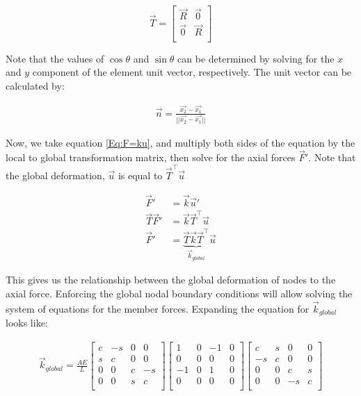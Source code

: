 \begin{equation}
	\vec{T}
	=	
	\begin{bmatrix}
		\vec{R} & \vec{0}\\
		\vec{0} & \vec{R}\\
	\end{bmatrix}
\end{equation}

Note that the values of $\cos\theta$ and $\sin\theta$ can be determined by solving for the $x$ and $y$ component of the element unit vector, respectively. The unit vector can be calculated by:

\begin{align}
	\vec{n} = \frac{\vec{x_2}-\vec{x_1}}{||\vec{x_2}-\vec{x_1}||}
\end{align}

Now, we take equation \ref{Eq:F=ku}, and multiply both sides of the equation by the local to global transformation matrix, then solve for the axial forces $\vec{F}'$. Note that the global deformation, $\vec{u}$ is equal to $\vec{T}^\intercal \vec{u}$

\begin{align}
	\vec{F}' &= \vec{k} \vec{u}'\\
	\vec{T} \vec{F}' &= \vec{k} \vec{T}^\intercal \vec{u}\\
	\vec{F}' &= \underbrace{\vec{T} \vec{k} \vec{T}^\intercal}_{\vec{k}_{global}} \vec{u}
\end{align}

This gives us the relationship between the global deformation of nodes to the axial force. Enforcing the global nodal boundary conditions will allow solving the system of equations for the member forces. Expanding the equation for $\vec{k}_{global}$ looks like:

\begin{align*}
\vec{k}_{global}
=
\frac{AE}{L}
	\begin{bmatrix}
  		c & -s & 0 & 0\\
  		s & c & 0 & 0\\
  		0 & 0 & c & -s\\
  		0 & 0 & s & c\\
	\end{bmatrix}
	\begin{bmatrix}
  		1 & 0 & -1 & 0\\
  		0 & 0 & 0 & 0\\
  		-1 & 0 & 1 & 0\\
  		0 & 0 & 0 & 0\\
	\end{bmatrix}
	\begin{bmatrix}
  		c & s & 0 & 0\\
  		-s & c & 0 & 0\\
  		0 & 0 & c & s\\
  		0 & 0 & -s & c\\
\end{bmatrix}
\end{align*}


